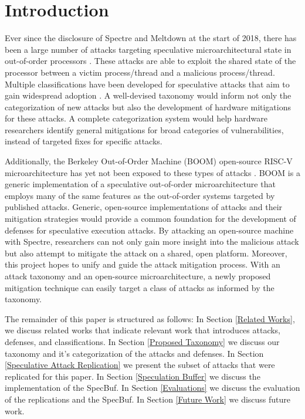 \section{Introduction}

Ever since the disclosure of Spectre and Meltdown at the start of 2018, there has
been a large number of attacks targeting speculative microarchitectural state in
out-of-order processors \cite{b1,b2}. These attacks are able to exploit the shared
state of the processor between a victim process/thread and a malicious process/thread.
Multiple classifications have been developed for speculative attacks 
that aim to gain widespread adoption \cite{b5,b6,b7,b9,b10}.
A well-devised taxonomy would inform not only the 
categorization of new attacks but also the development of hardware mitigations for 
these attacks. A complete categorization system would help hardware researchers 
identify general mitigations for broad categories of vulnerabilities, instead of 
targeted fixes for specific attacks.

Additionally, the Berkeley Out-of-Order Machine (BOOM) open-source RISC-V
microarchitecture has yet not been exposed to these types of attacks \cite{b11}. BOOM
is a generic implementation of a speculative 
out-of-order microarchitecture that employs many of the same features as the 
out-of-order systems targeted by published attacks. Generic, open-source 
implementations of attacks and their mitigation strategies would provide a common 
foundation for the development of defenses for speculative execution attacks.
By attacking an open-source machine with Spectre, researchers can not only gain more 
insight into the malicious attack but also attempt to mitigate the attack on a shared,
open platform. Moreover, this project hopes to unify and guide the attack 
mitigation process. With an attack taxonomy and an open-source microarchitecture, a 
newly proposed mitigation technique can easily target a class of attacks as informed 
by the taxonomy.

The remainder of this paper is structured as follows: In Section \ref{Related Works}, we discuss
related works that indicate relevant work that introduces attacks, defenses, and classifications.
In Section \ref{Proposed Taxonomy} we discuss our taxonomy and it's categorization of the attacks and defenses. In
Section \ref{Speculative Attack Replication} we present the subset of attacks that were replicated for this paper. In Section \ref{Speculation Buffer}
we discuss the implementation of the SpecBuf. In Section \ref{Evaluations} we discuss the evaluation of the
replications and the SpecBuf. In Section \ref{Future Work} we discuss future work.
